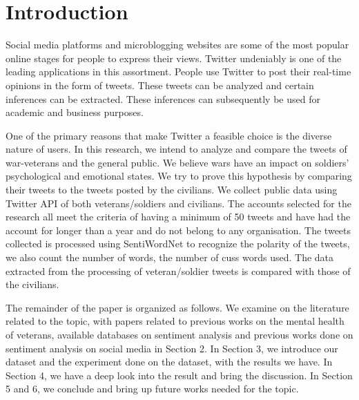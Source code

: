 \section{Introduction}

Social media platforms and microblogging websites are some of the most popular online stages for people to express their views. Twitter undeniably is one of the leading applications in this assortment. People use Twitter to post their real-time opinions in the form of tweets. These tweets can be analyzed and certain inferences can be extracted. These inferences can subsequently be used for academic and business purposes.

One of the primary reasons that make Twitter a feasible choice is the diverse nature of users. In this research, we intend to analyze and compare the tweets of war-veterans and the general public. We believe wars have an impact on soldiers' psychological and emotional states. We try to prove this hypothesis by comparing their tweets to the tweets posted by the civilians. We collect public data using Twitter API of both veterans/soldiers and civilians. The accounts selected for the research all meet the criteria of having a minimum of 50 tweets and have had the account for longer than a year and do not belong to any organisation. The tweets collected is processed using SentiWordNet to recognize the polarity of the tweets, we also count the number of words, the number of cuss words used. The data extracted from the processing of veteran/soldier tweets is compared with those of the civilians.

The remainder of the paper is organized as follows. We examine on the literature related to the topic, with papers related to previous works on the mental health of veterans, available databases on sentiment analysis and previous works done on sentiment analysis on social media in Section 2. In Section 3, we introduce our dataset and the experiment done on the dataset, with the results we have. In Section 4, we have a deep look into the result and bring the discussion. In Section 5 and 6, we conclude and bring up future works needed for the topic.
